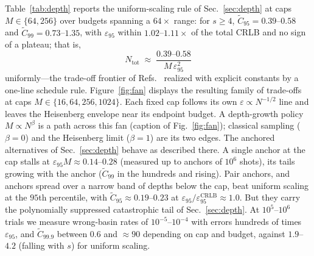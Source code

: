 \documentclass[%
 twocolumn,
 amsmath,amssymb,
prx,
longbibliography
]{revtex4-2}
\newcommand{\Ntot}{N_{\mathrm{tot}}}
\begin{document}
Table~\ref{tab:depth} reports the uniform-scaling rule of Sec.~\ref{sec:depth} at caps $M \in \{64, 256\}$ over budgets spanning a $64\times$ range: for $s \ge 4$, $\widetilde C_{95} = 0.39$--$0.58$ and $\widetilde C_{99} = 0.73$--$1.35$, with $\varepsilon_{95}$ within $1.02$--$1.11\times$ of the total \ac{CRLB} and no sign of a plateau; that is,
\begin{equation}
    \Ntot \;\approx\; \frac{0.39\text{--}0.58}{M\,\varepsilon_{95}^2}
\end{equation}
uniformly---the trade-off frontier of Refs.~\cite{giurgica2022low, huang2026eigengap, erle2026anydepth} realized with explicit constants by a one-line schedule rule. Figure~\ref{fig:fan} displays the resulting family of trade-offs at caps $M \in \{16, 64, 256, 1024\}$. Each fixed cap follows its own $\varepsilon \propto N^{-1/2}$ line and leaves the Heisenberg envelope near its endpoint budget. A depth-growth policy $M \propto N^{\beta}$ is a path across this fan (caption of Fig.~\ref{fig:fan}); classical sampling ($\beta = 0$) and the Heisenberg limit ($\beta = 1$) are its two edges. The anchored alternatives of Sec.~\ref{sec:depth} behave as described there. A single anchor at the cap stalls at $\varepsilon_{95}M \approx 0.14$--$0.28$ (measured up to anchors of $10^6$ shots), its tails growing with the anchor ($\widetilde C_{99}$ in the hundreds and rising). Pair anchors, and anchors spread over a narrow band of depths below the cap, beat uniform scaling at the $95$th percentile, with $\widetilde C_{95} \approx 0.19$--$0.23$ at $\varepsilon_{95}/\varepsilon_{95}^{\mathrm{CRLB}} \approx 1.0$. But they carry the polynomially suppressed catastrophic tail of Sec.~\ref{sec:depth}. At $10^{5}$--$10^{6}$ trials we measure wrong-basin rates of $10^{-5}$--$10^{-4}$ with errors hundreds of times $\varepsilon_{95}$, and $\widetilde C_{99.9}$ between $0.6$ and $\approx 90$ depending on cap and budget, against $1.9$--$4.2$ (falling with $s$) for uniform scaling.
\end{document}

